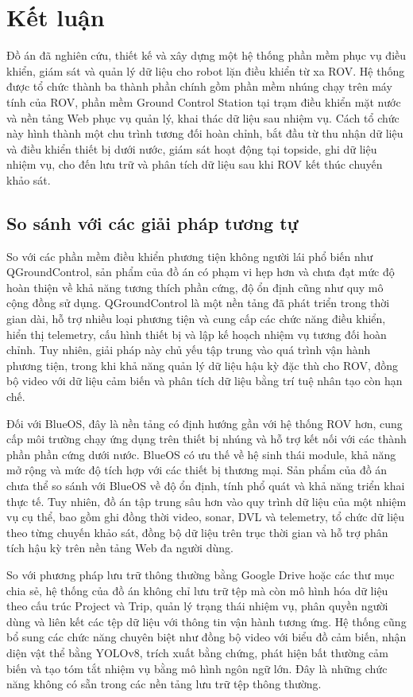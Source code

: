 \documentclass[../DoAn.tex]{subfiles}
\begin{document}
\section{Kết luận}

Đồ án đã nghiên cứu, thiết kế và xây dựng một hệ thống phần mềm phục vụ điều khiển, giám sát và quản lý dữ liệu cho robot lặn điều khiển từ xa ROV. Hệ thống được tổ chức thành ba thành phần chính gồm phần mềm nhúng chạy trên máy tính của ROV, phần mềm Ground Control Station tại trạm điều khiển mặt nước và nền tảng Web phục vụ quản lý, khai thác dữ liệu sau nhiệm vụ. Cách tổ chức này hình thành một chu trình tương đối hoàn chỉnh, bắt đầu từ thu nhận dữ liệu và điều khiển thiết bị dưới nước, giám sát hoạt động tại topside, ghi dữ liệu nhiệm vụ, cho đến lưu trữ và phân tích dữ liệu sau khi ROV kết thúc chuyến khảo sát.

\subsection{So sánh với các giải pháp tương tự}

So với các phần mềm điều khiển phương tiện không người lái phổ biến như QGroundControl, sản phẩm của đồ án có phạm vi hẹp hơn và chưa đạt mức độ hoàn thiện về khả năng tương thích phần cứng, độ ổn định cũng như quy mô cộng đồng sử dụng. QGroundControl là một nền tảng đã phát triển trong thời gian dài, hỗ trợ nhiều loại phương tiện và cung cấp các chức năng điều khiển, hiển thị telemetry, cấu hình thiết bị và lập kế hoạch nhiệm vụ tương đối hoàn chỉnh. Tuy nhiên, giải pháp này chủ yếu tập trung vào quá trình vận hành phương tiện, trong khi khả năng quản lý dữ liệu hậu kỳ đặc thù cho ROV, đồng bộ video với dữ liệu cảm biến và phân tích dữ liệu bằng trí tuệ nhân tạo còn hạn chế.

Đối với BlueOS, đây là nền tảng có định hướng gần với hệ thống ROV hơn, cung cấp môi trường chạy ứng dụng trên thiết bị nhúng và hỗ trợ kết nối với các thành phần phần cứng dưới nước. BlueOS có ưu thế về hệ sinh thái module, khả năng mở rộng và mức độ tích hợp với các thiết bị thương mại. Sản phẩm của đồ án chưa thể so sánh với BlueOS về độ ổn định, tính phổ quát và khả năng triển khai thực tế. Tuy nhiên, đồ án tập trung sâu hơn vào quy trình dữ liệu của một nhiệm vụ cụ thể, bao gồm ghi đồng thời video, sonar, DVL và telemetry, tổ chức dữ liệu theo từng chuyến khảo sát, đồng bộ dữ liệu trên trục thời gian và hỗ trợ phân tích hậu kỳ trên nền tảng Web đa người dùng.

So với phương pháp lưu trữ thông thường bằng Google Drive hoặc các thư mục chia sẻ, hệ thống của đồ án không chỉ lưu trữ tệp mà còn mô hình hóa dữ liệu theo cấu trúc Project và Trip, quản lý trạng thái nhiệm vụ, phân quyền người dùng và liên kết các tệp dữ liệu với thông tin vận hành tương ứng. Hệ thống cũng bổ sung các chức năng chuyên biệt như đồng bộ video với biểu đồ cảm biến, nhận diện vật thể bằng YOLOv8, trích xuất bằng chứng, phát hiện bất thường cảm biến và tạo tóm tắt nhiệm vụ bằng mô hình ngôn ngữ lớn. Đây là những chức năng không có sẵn trong các nền tảng lưu trữ tệp thông thường.
\end{document}
